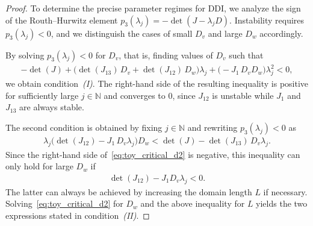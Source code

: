 \documentclass[10pt,a4paper]{amsart}
\begin{document}
\begin{proof}
    To determine the precise parameter regimes for DDI, we analyze the sign of the Routh--Hurwitz element $p_3(\lambda_j) = - \det(J - \lambda_j D)$. Instability requires $p_3(\lambda_j)<0$, and we distinguish the cases of small $D_v$ and large $D_w$ accordingly.
    
    By solving $p_3(\lambda_j) < 0$ for $D_v$, that is, finding values of $D_v$ such that
    \begin{align}
    -\det(J) + \biggl( \det(J_{13})\,D_v + \det(J_{12}) \,D_w \biggr) \lambda_j + \biggl( -J_1\, D_v D_w \biggr) \lambda_j^2 < 0,
    \end{align}
    we obtain condition~\emph{(I)}.  
    The right-hand side of the resulting inequality is positive for sufficiently large $j \in \mathbb{N}$ and converges to $0$, since $J_{12}$ is unstable while $J_1$ and $J_{13}$ are always stable.

    The second condition is obtained by fixing $j \in \mathbb{N}$ and rewriting $p_3(\lambda_j) < 0$ as
    \begin{align}
    \label{eq:toy_critical_d2}
        \lambda_j \big( \det(J_{12}) - J_1\, D_v \lambda_j \big) D_w 
        < \det(J) - \det(J_{13})\,D_v \lambda_j.
    \end{align}
    Since the right-hand side of~\eqref{eq:toy_critical_d2} is negative, this inequality can only hold for large $D_w$ if
    \begin{align}
        \det(J_{12}) - J_1 D_v \lambda_j < 0.
    \end{align}
    The latter can always be achieved by increasing the domain length $L$ if necessary. 
    Solving~\eqref{eq:toy_critical_d2} for $D_w$ and the above inequality for $L$ yields the two expressions stated in condition~\emph{(II)}.
\end{proof}
\end{document}
